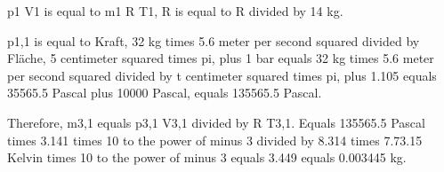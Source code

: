 p1 V1 is equal to m1 R T1, R is equal to R divided by 14 kg.

p1,1 is equal to Kraft, 32 kg times 5.6 meter per second squared divided by Fläche, 5 centimeter squared times pi, plus 1 bar equals 32 kg times 5.6 meter per second squared divided by t centimeter squared times pi, plus 1.105 equals 35565.5 Pascal plus 10000 Pascal, equals 135565.5 Pascal.

Therefore, m3,1 equals p3,1 V3,1 divided by R T3,1. Equals 135565.5 Pascal times 3.141 times 10 to the power of minus 3 divided by 8.314 times 7.73.15 Kelvin times 10 to the power of minus 3 equals 3.449 equals 0.003445 kg.